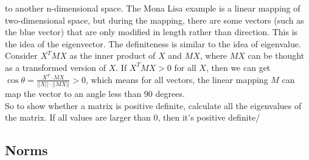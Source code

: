 \documentclass[12pt]{report}
\begin{document}
to another n-dimensional space.
The Mona Lisa example is a linear mapping of two-dimensional space, but during the mapping, there are some vectors (such as the blue vector)
that are only modified in length rather than direction. This is the idea of the eigenvector.
The definiteness is similar to the idea of eigenvalue. Consider $X^T MX$ as the inner product of $X$ and $MX$, where
$MX$ can be thought as a transformed version of $X$. If $X^T MX>0$ for all $X$,
then we can get $\cos \theta=\frac{X^T \cdot MX}{||X||\cdot ||MX||}>0$, which means for all vectors, the linear mapping $M$ can map
the vector to an angle less than 90 degrees.\\
So to show whether a matrix is positive definite, calculate all the eigenvalues of the matrix. If all values are larger than 0, then it's positive definite/

\subsection{Norms}
\end{document}
